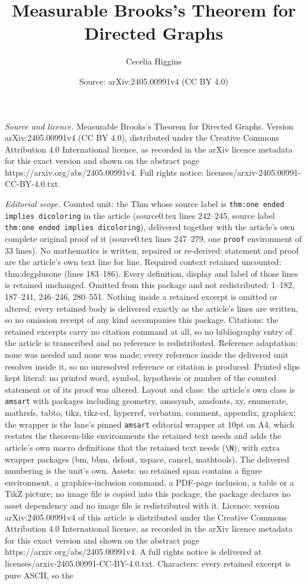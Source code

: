 \documentclass[10pt,a4paper]{amsart}
\title[Measurable Brooks's Theorem for Directed Graphs]{Measurable Brooks's Theorem for Directed Graphs}
\author{Cecelia Higgins}
\date{Source: arXiv:2405.00991v4 (CC BY 4.0)}
\begin{document}
\maketitle

\noindent\emph{Source and licence.} Measurable Brooks's Theorem for Directed Graphs. Version arXiv:2405.00991v4 (CC BY 4.0), distributed under the Creative Commons Attribution 4.0 International licence, as recorded in the arXiv licence metadata for this exact version and shown on the abstract page https://arxiv.org/abs/2405.00991v4. Full rights notice: licenses/arxiv-2405.00991-CC-BY-4.0.txt.\par\smallskip

\noindent\textit{Editorial scope.} Counted unit: the Thm whose source label is \texttt{thm:one ended implies dicoloring} in the article (source0.tex lines 242--245, source label \texttt{thm:one ended implies dicoloring}), delivered together with the article's own complete original proof of it (source0.tex lines 247--279, one \texttt{proof} environment of 33 lines). No mathematics is written, repaired or re-derived: statement and proof are the article's own text line for line. Required context retained uncounted: thm:degplusone (lines 183--186). Every definition, display and label of those lines is retained unchanged. Omitted from this package and not redistributed: 1--182, 187--241, 246--246, 280--551. Nothing inside a retained excerpt is omitted or altered: every retained body is delivered exactly as the article's lines are written, so no omission receipt of any kind accompanies this package. Citations: the retained excerpts carry no citation command at all, so no bibliography entry of the article is transcribed and no reference is redistributed. Reference adaptation: none was needed and none was made; every reference inside the delivered unit resolves inside it, so no unresolved reference or citation is produced. Printed slips kept literal: no printed word, symbol, hypothesis or number of the counted statement or of its proof was altered. Layout and class: the article's own class is \texttt{amsart} with packages including geometry, amssymb, amsfonts, xy, enumerate, mathrsfs, tabto, tikz, tikz-cd, hyperref, verbatim, comment, appendix, graphicx; the wrapper is the lane's pinned \texttt{amsart} editorial wrapper at 10pt on A4, which restates the theorem-like environments the retained text needs and adds the article's own macro definitions that the retained text needs (\texttt{\textbackslash N}), with extra wrapper packages (bm, bbm, dsfont, xspace, cancel, mathtools). The delivered numbering is the unit's own. Assets: no retained span contains a figure environment, a graphics-inclusion command, a PDF-page inclusion, a table or a TikZ picture; no image file is copied into this package, the package declares no asset dependency and no image file is redistributed with it. Licence: version arXiv:2405.00991v4 of this article is distributed under the Creative Commons Attribution 4.0 International licence, as recorded in the arXiv licence metadata for this exact version and shown on the abstract page https://arxiv.org/abs/2405.00991v4. A full rights notice is delivered at licenses/arxiv-2405.00991-CC-BY-4.0.txt. Characters: every retained excerpt is pure ASCII, so the 
\end{document}
